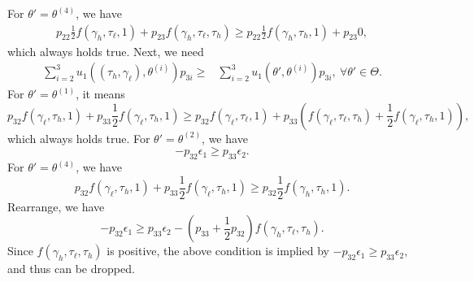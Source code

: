 For $\theta'=\theta^{(4)}$, we have 
\begin{equation*}
    \begin{split}
 p_{22}\frac{1}{2}f(\gamma_h,\tau_{\ell},1) + p_{23} f(\gamma_h,\tau_{\ell},\tau_{h}) \geq  p_{22} \frac{1}{2}f(\gamma_{h},\tau_h,1) + p_{23} 0,     
    \end{split}
\end{equation*}
which always holds true. Next, we need 
\begin{equation*}
    \begin{split}
     \sum_{i=2}^3 u_1\left((\tau_{h},\gamma_{\ell}),\theta^{(i)}\right)p_{3i} \geq {} &    \sum_{i=2}^3 u_1\left(\theta',\theta^{(i)}\right)p_{3i},\ \forall \theta'\in\Theta. 
    \end{split}
\end{equation*}
For $\theta'=\theta^{(1)}$, it means 
$$p_{32} f(\gamma_{\ell},\tau_{h},1) + p_{33}\frac{1}{2}f(\gamma_{\ell},\tau_h,1)\geq p_{32} f(\gamma_{\ell},\tau_{\ell},1) + p_{33} \left(f(\gamma_{\ell},\tau_{\ell},\tau_h)+\frac{1}{2}f(\gamma_{\ell},\tau_h,1)\right), $$
which always holds true. For $\theta'=\theta^{(2)}$, we have 
$$ -p_{32}\epsilon_1\geq p_{33}\epsilon_2.$$
For $\theta'=\theta^{(4)}$, we have 
$$ p_{32} f(\gamma_{\ell},\tau_{h},1) + p_{33}\frac{1}{2}f(\gamma_{\ell},\tau_h,1) \geq p_{32} \frac{1}{2} f(\gamma_{h},\tau_h,1). $$
Rearrange, we have
$$ -p_{32}\epsilon_1\geq p_{33}\epsilon_2 -\left(p_{33}+\frac{1}{2}p_{32}\right)f(\gamma_{h},\tau_{\ell},\tau_h). $$
Since $f(\gamma_{h},\tau_{\ell},\tau_h)$ is positive, the above condition is implied by $ -p_{32}\epsilon_1\geq p_{33}\epsilon_2,$ and thus can be dropped. 

